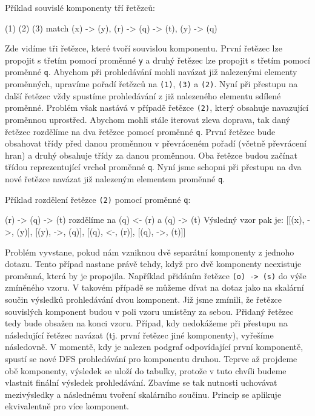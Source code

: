 Příklad souvislé komponenty tří řetězců:
\begin{code}
      (1)         (2)                (3)
match (x) -> (y), (r) -> (q) -> (t), (y) -> (q)
\end{code}
Zde vidíme tři řetězce, které tvoří souvislou komponentu.
První řetězec lze propojit s třetím pomocí proměnné \texttt{y} a druhý řetězec lze propojit s třetím pomocí proměnné \texttt{q}.
Abychom při prohledávání mohli navázat již nalezenými elementy proměnných, upravíme pořadí řetězců na \texttt{(1)}, \texttt{(3)} a \texttt{(2)}.
Nyní při přestupu na další řetězec vždy spustíme prohledávání z již nalezeného elementu sdílené proměnné.
Problém však nastává v případě řetězce \texttt{(2)}, který obsahuje navazující proměnnou uprostřed.
Abychom mohli stále iterovat zleva doprava, tak daný řetězec rozdělíme na dva řetězce pomocí proměnné \texttt{q}.
První řetězec bude obsahovat třídy před danou proměnnou v převráceném pořadí (včetně převrácení hran) a druhý obsahuje třídy za danou proměnnou.
Oba řetězce budou začínat třídou reprezentující vrchol proměnné \texttt{q}. 
Nyní jsme schopni při přestupu na dva nové řetězce navázat již nalezeným elementem proměnné \texttt{q}.

Příklad rozdělení řetězce \texttt{(2)} pomocí proměnné \texttt{q}:
\begin{code}
(r) -> (q) -> (t) rozdělíme na (q) <- (r) a (q) -> (t)
Výsledný vzor pak je:
[[(x), ->, (y)], [(y), ->, (q)], [(q), <-, (r)], [(q), ->, (t)]]
\end{code}

Problém vyvstane, pokud nám vzniknou dvě separátní komponenty z jednoho dotazu.
Tento případ nastane právě tehdy, když pro dvě komponenty neexistuje proměnná, která by je propojila.
Například přidáním řetězce \texttt{(o) -> (s)} do výše zmíněného vzoru.
V takovém případě se můžeme dívat na dotaz jako na skalární součin výsledků prohledávání dvou komponent.
Již jsme zmínili, že řetězce souvislých komponent budou v poli vzoru umístěny za sebou.
Přidaný řetězec tedy bude obsažen na konci vzoru.
Případ, kdy nedokážeme při přestupu na následující řetězec navázat (tj. první řetězec jiné komponenty), vyřešíme následovně.
V momentě, kdy je nalezen podgraf odpovídající první komponentě, spustí se nové DFS prohledávání pro komponentu druhou.
Teprve až projdeme obě komponenty, výsledek se uloží do tabulky, protože v tuto chvíli budeme vlastnit finální výsledek prohledávání.
Zbavíme se tak nutnosti uchovávat mezivýsledky a následnému tvoření skalárního součinu.
Princip se aplikuje ekvivalentně pro více komponent.

